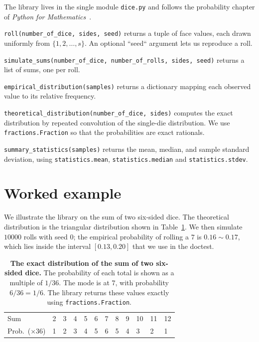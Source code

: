 \documentclass[11pt]{article}
\begin{document}
The library lives in the single module \texttt{dice.py} and follows
the probability chapter of \emph{Python for
Mathematics}~\cite{knight2024}.

\texttt{roll(number\_of\_dice, sides, seed)} returns
a tuple of face values, each drawn uniformly from
\(\{1, 2, \dots, s\}\). An optional ``seed`` argument lets us
reproduce a roll.

\texttt{simulate\_sums(number\_of\_dice,
number\_of\_rolls, sides, seed)} returns a list of sums, one per roll.

\texttt{empirical\_distribution(samples)} returns a dictionary
mapping each observed value to its relative frequency.

\texttt{theoretical\_distribution(number\_of\_dice, sides)} computes
the exact distribution by repeated convolution of the single-die
distribution. We use \texttt{fractions.Fraction} so that the
probabilities are exact rationals.

\texttt{summary\_statistics(samples)}
returns the mean, median, and sample standard deviation, using
\texttt{statistics.mean}, \texttt{statistics.median} and
\texttt{statistics.stdev}.

\section{Worked example}

We illustrate the library on the sum of two six-sided dice. The
theoretical distribution is the triangular distribution shown in
Table~\ref{tab:two-d6}. We then simulate \(10000\) rolls with
seed \(0\); the empirical probability of rolling a \(7\) is
\(0.16{\sim}0.17\), which lies inside the interval \([0.13, 0.20]\)
that we use in the doctest.

\begin{table}[h]
\centering
\begin{tabular}{l l l l l l l l l l l l}
\toprule
Sum & 2 & 3 & 4 & 5 & 6 & 7 & 8 & 9 & 10 & 11 & 12 \\
Prob.\ (\(\times 36\)) & 1 & 2 & 3 & 4 & 5 & 6 & 5 & 4 & 3 & 2 & 1 \\
\bottomrule
\end{tabular}
\caption{\textbf{The exact distribution of the sum of two six-sided
dice.} The probability of each total is shown as a multiple of
\(1/36\). The mode is at \(7\), with probability \(6/36 = 1/6\).
The library returns these values exactly using
\texttt{fractions.Fraction}.}
\label{tab:two-d6}
\end{table}
\end{document}
